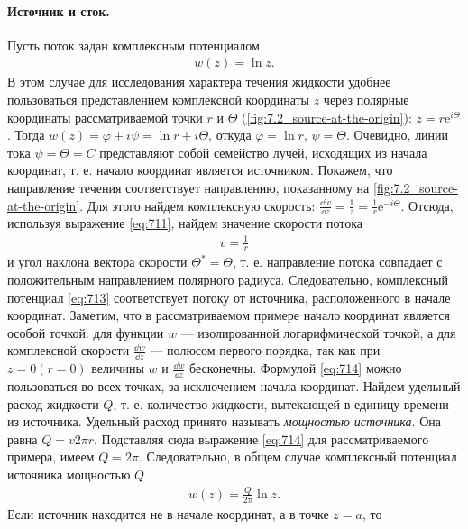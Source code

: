	\paragraph{Источник и сток.} Пусть поток задан комплексным потенциалом
	\begin{gather}
		w\left(z\right) = \ln z.\label{eq:713}
	\end{gather}\n
	В этом случае для исследования характера течения жидкости удобнее пользоваться представлением комплексной координаты $z$ через полярные координаты рассматриваемой точки $r$ и $\varTheta$ (\cref{fig:7.2_source-at-the-origin}): $z = r\mathrm{e}^{i\varTheta}$. Тогда $w\left(z\right) = \varphi + i\psi = \ln r + i\varTheta$, откуда $\varphi = \ln r$, $\psi = \varTheta$.\n
	Очевидно, линии тока $\psi = \varTheta = C$ представляют собой семейство лучей, исходящих из начала координат, т. е. начало координат является источником. Покажем, что направление течения соответствует направлению, показанному на \cref{fig:7.2_source-at-the-origin}. Для этого найдем комплексную скорость: $\frac{\dd w}{\dd z} = \frac{1}{z} = \frac{1}{r}\mathrm{e}^{-i\varTheta}$. Отсюда, используя выражение \eqref{eq:711}, найдем значение скорости потока
	\begin{gather}
		v = \frac{1}{r}\label{eq:714}
	\end{gather}
	и угол наклона вектора скорости $\varTheta^* = \varTheta$, т. е. направление потока совпадает с положительным направлением полярного радиуса. Следовательно, комплексный потенциал \eqref{eq:713} соответствует потоку от источника, расположенного в начале координат.\n
	Заметим, что в рассматриваемом примере начало координат является особой точкой: для функции $w$ --- изолированной логарифмической точкой, а для комплексной скорости $\frac{\dd w}{\dd z}$ --- полюсом первого порядка, так как при $z = 0 \left(r = 0\right)$ величины $w$ и $\frac{\dd w}{\dd z}$ бесконечны. Формулой \eqref{eq:714} можно пользоваться во всех точках, за исключением начала координат.\n
	Найдем удельный расход жидкости $Q$, т. е. количество жидкости, вытекающей в единицу времени из источника. Удельный расход принято называть \textit{мощностью источника}. Она равна $Q = v2\pi r$. Подставляя сюда выражение \eqref{eq:714} для рассматриваемого примера, имеем $Q = 2\pi$.\n
	Следовательно, в общем случае комплексный потенциал источника мощностью $Q$
	\begin{gather}
		w\left(z\right) = \frac{Q}{2\pi}\ln z.\label{eq:715}
	\end{gather}\n
	Если источник находится не в начале координат, а в точке $z = a$, то
